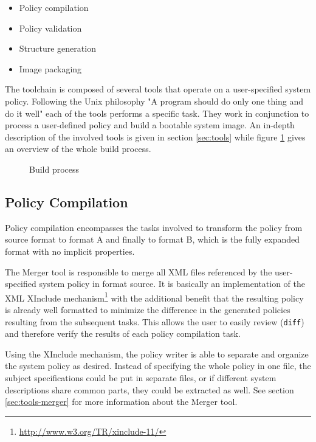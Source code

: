 \documentclass[a4paper,twoside,titlepage]{article}
\begin{document}
\begin{itemize}
	\item Policy compilation
	\item Policy validation
	\item Structure generation
	\item Image packaging
\end{itemize}

The toolchain is composed of several tools that operate on a user-specified
system policy. Following the Unix philosophy "A program should do only one thing
and do it well" each of the tools performs a specific task. They work in
conjunction to process a user-defined policy and build a bootable system image.
An in-depth description of the involved tools is given in section
\ref{sec:tools} while figure \ref{fig:build-process} gives an overview of the
whole build process.

\begin{figure}[h]
	\centering
	
	\caption{Build process}
	\label{fig:build-process}
\end{figure}

\subsection{Policy Compilation}
\label{sec:build-policy_compilation}
Policy compilation encompasses the tasks involved to transform the policy from
source format to format A and finally to format B, which is the fully expanded
format with no implicit properties.

The Merger tool is responsible to merge all XML files referenced by the
user-specified system policy in format source. It is basically an implementation
of the XML XInclude mechanism\footnote{\url{http://www.w3.org/TR/xinclude-11/}}
with the additional benefit that the resulting policy is already well formatted
to minimize the difference in the generated policies resulting from the
subsequent tasks.  This allows the user to easily review (\texttt{diff}) and
therefore verify the results of each policy compilation task.

Using the XInclude mechanism, the policy writer is able to separate and organize
the system policy as desired. Instead of specifying the whole policy in one
file, the subject specifications could be put in separate files, or if different
system descriptions share common parts, they could be extracted as well. See
section \ref{sec:tools-merger} for more information about the Merger tool.
\end{document}
